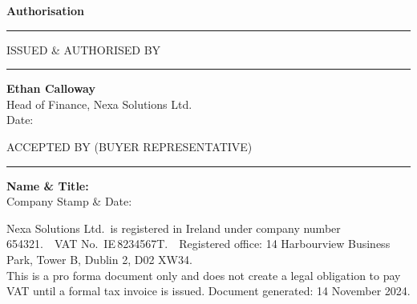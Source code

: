 \documentclass[11pt,a4paper]{article}
\newcommand{\labeltext}[1]{\textcolor{TextLight}{\footnotesize\MakeUppercase{#1}}}
\newcommand{\sectionrule}{%
  \noindent\textcolor{NexaTeal}{\rule{\linewidth}{1.5pt}}%
}
\begin{document}
\par\vspace{6mm}

{\color{NexaNavy}\large\bfseries Authorisation}
\par\vspace{2mm}
\sectionrule
\par\vspace{5mm}

\noindent
\begin{minipage}[t]{0.45\linewidth}
  \begin{tcolorbox}[notebox, height=40mm]
    \labeltext{Issued \& Authorised by}
    \par\vspace{10mm}
    \noindent\textcolor{BorderLight}{\rule{0.8\linewidth}{0.5pt}}
    \par\vspace{3pt}
    {\small\bfseries\color{NexaNavy}Ethan Calloway}\\
    {\footnotesize\color{TextMid}Head of Finance, Nexa Solutions Ltd.}\\
    {\footnotesize\color{TextMid}Date: \underline{\hspace{30mm}}}
  \end{tcolorbox}
\end{minipage}%
\hfill
\begin{minipage}[t]{0.45\linewidth}
  \begin{tcolorbox}[notebox, height=40mm]
    \labeltext{Accepted by (Buyer Representative)}
    \par\vspace{10mm}
    \noindent\textcolor{BorderLight}{\rule{0.8\linewidth}{0.5pt}}
    \par\vspace{3pt}
    {\small\bfseries\color{TextMid}Name \& Title:\ \underline{\hspace{32mm}}}\\[2pt]
    {\footnotesize\color{TextMid}Company Stamp \& Date:\ \underline{\hspace{18mm}}}
  \end{tcolorbox}
\end{minipage}

\par\vspace{5mm}

\begin{tcolorbox}[
  enhanced, boxrule=0pt, arc=0pt,
  colback=NexaNavy, colframe=NexaNavy,
  left=10pt, right=10pt, top=6pt, bottom=6pt
]
  \centering
  {\color{NexaMid}\footnotesize
   Nexa Solutions Ltd.\ is registered in Ireland under company number 654321.\ \textbullet\
   VAT No.\ IE\,8234567T.\ \textbullet\
   Registered office: 14 Harbourview Business Park, Tower B, Dublin 2, D02 XW34.}\\[2pt]
  {\color{TextLight}\scriptsize
   This is a pro forma document only and does not create a legal obligation to pay VAT until
   a formal tax invoice is issued. Document generated: 14 November 2024.}
\end{tcolorbox}
\end{document}
